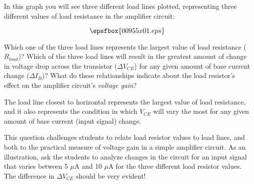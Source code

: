 

In this graph you will see three different load lines plotted, representing three different values of load resistance in the amplifier circuit:

$$\epsfbox{00955x01.eps}$$

Which one of the three load lines represents the largest value of load resistance ($R_{load}$)?  Which of the three load lines will result in the greatest amount of change in voltage drop across the transistor ($\Delta V_{CE}$) for any given amount of base current change ($\Delta I_B$)?  What do these relationships indicate about the load resistor's effect on the amplifier circuit's {\it voltage gain}?







The load line closest to horizontal represents the largest value of load resistance, and it also represents the condition in which $V_{CE}$ will vary the most for any given amount of base current (input signal) change.







This question challenges students to relate load resistor values to load lines, and both to the practical measure of voltage gain in a simple amplifier circuit.  As an illustration, ask the students to analyze changes in the circuit for an input signal that varies between 5 $\mu$A and 10 $\mu$A for the three different load resistor values.  The difference in $\Delta V_{CE}$ should be very evident!



